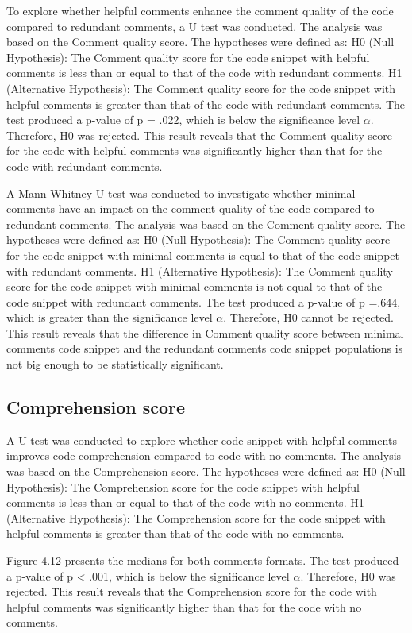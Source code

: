 To explore whether helpful comments enhance the comment quality of the code compared to redundant comments, a  U test was conducted.  The analysis was based on the Comment quality score. The hypotheses were defined as: H0 (Null Hypothesis): The Comment quality score for the code snippet with helpful comments is less than or equal to that of the code with redundant comments.  H1 (Alternative Hypothesis): The Comment quality score for the code snippet with helpful comments is greater than that of the code with redundant comments. The test produced a p-value of p = .022, which is below the significance level $\alpha $. Therefore, H0 was rejected. This result reveals that the Comment quality score for the code with helpful comments was significantly higher than that for the code with redundant comments. 



A Mann-Whitney U test was conducted to investigate whether minimal comments have an impact on the comment quality of the code compared to redundant comments. The analysis was based on the Comment quality score. The hypotheses were defined as: H0 (Null Hypothesis): The Comment quality score for the code snippet with minimal comments is equal to that of the code snippet with redundant comments. H1 (Alternative Hypothesis): The Comment quality score for the code snippet with minimal comments is not equal to that of the code snippet with redundant comments.  The test produced a p-value of p =.644, which is greater than the significance level $\alpha$. Therefore, H0 cannot be rejected. This result reveals that the difference in Comment quality score between minimal comments code snippet and the redundant comments code snippet populations is not big enough to be statistically significant.


\subsection{Comprehension score}
A U test was conducted to explore whether code snippet with helpful comments improves code comprehension compared to code with no comments. The analysis was based on the Comprehension score. The hypotheses were defined as: H0 (Null Hypothesis): The Comprehension score for the code snippet with helpful comments is less than or equal to that of the code with no comments.  H1 (Alternative Hypothesis): The Comprehension score for the code snippet with helpful comments is greater than that of the code with no comments.


Figure 4.12 presents the medians for both comments formats.
The test produced a p-value of  p < .001, which is below the significance level $\alpha $. Therefore, H0 was rejected.  This result reveals that the Comprehension score for the code with helpful comments was significantly higher than that for the code with no comments. 


